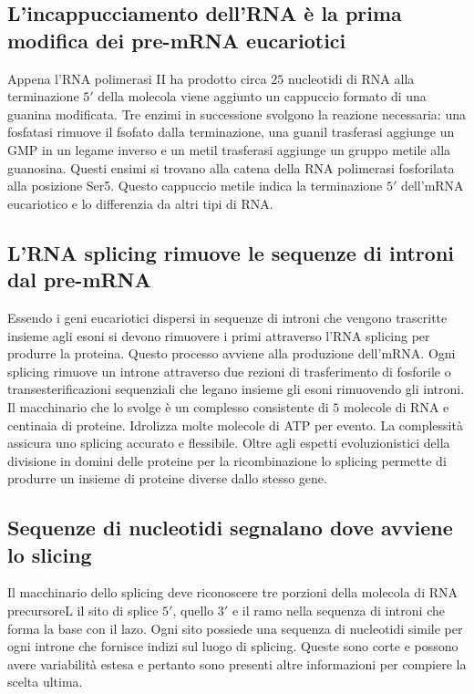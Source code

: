\subsection{L'incappucciamento dell'RNA \`e la prima modifica dei pre-mRNA eucariotici}
Appena l'RNA polimerasi II ha prodotto circa $25$ nucleotidi di RNA alla terminazione $5'$ della molecola viene aggiunto un cappuccio formato di una guanina modificata. Tre enzimi in 
successione svolgono la reazione necessaria: una fosfatasi rimuove il fsofato dalla terminazione, una guanil trasferasi aggiunge un GMP in un legame inverso e un metil trasferasi
aggiunge un gruppo metile alla guanosina. Questi ensimi si trovano alla catena della RNA polimerasi fosforilata alla posizione Ser5. Questo cappuccio metile indica la terminazione
$5'$ dell'mRNA eucariotico e lo differenzia da altri tipi di RNA. 
\subsection{L'RNA splicing rimuove le sequenze di introni dal pre-mRNA}
Essendo i geni eucariotici dispersi in sequenze di introni che vengono trascritte insieme agli esoni si devono rimuovere i primi attraverso l'RNA splicing per produrre la proteina.
Questo processo avviene alla produzione dell'mRNA. Ogni splicing rimuove un introne attraverso due rezioni di trasferimento di fosforile o transesterificazioni sequenziali che legano 
insieme gli esoni rimuovendo gli introni. Il macchinario che lo svolge \`e un complesso consistente di $5$ molecole di RNA e centinaia di proteine. Idrolizza molte molecole di ATP per
evento. La complessit\`a assicura uno splicing accurato e flessibile. Oltre agli espetti evoluzionistici della divisione in domini delle proteine per la ricombinazione lo splicing
permette di produrre un insieme di proteine diverse dallo stesso gene. 
\subsection{Sequenze di nucleotidi segnalano dove avviene lo slicing}
Il macchinario dello splicing deve riconoscere tre porzioni della molecola di RNA precursoreL il sito di splice $5'$, quello $3'$ e il ramo nella sequenza di introni che forma la base
con il lazo. Ogni sito possiede una sequenza di nucleotidi simile per ogni introne che fornisce indizi sul luogo di splicing. Queste sono corte e possono avere variabilit\`a estesa e 
pertanto sono presenti altre informazioni per compiere la scelta ultima. 
